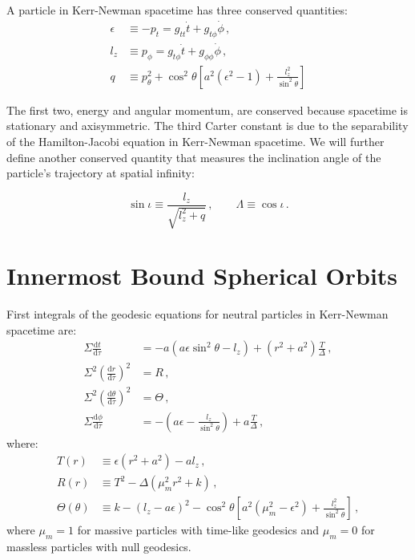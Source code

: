\documentclass[11pt, twocolumn]{article}
\begin{document}
A particle in Kerr-Newman spacetime has three conserved quantities:
\begin{equation}
    \begin{split}
        \epsilon &\equiv -p_{t} = g_{tt} \dot{t} + g_{t\phi} \dot{\phi} \, , \\
        l_{z} &\equiv p_{\phi} = g_{t\phi} \dot{t} + g_{\phi\phi} \dot{\phi} \, , \\
        q &\equiv p_{\theta}^{2} + \cos^{2}{\theta} \left[ a^{2} (\epsilon^{2} - 1) + \frac{l_{z}^{2}}{\sin^{2}{\theta}} \right]
    \end{split}
\end{equation}

The first two, energy and angular momentum, are conserved because spacetime is stationary and axisymmetric. The third Carter constant is due to the separability of the Hamilton-Jacobi equation in Kerr-Newman spacetime. We will further define another conserved quantity that measures the inclination angle of the particle's trajectory at spatial infinity:

\begin{equation}
    \sin{\iota} \equiv \frac{l_{z}}{\sqrt{l_{z}^{2} + q}} \, , \qquad \Lambda \equiv \cos{\iota} \, .
\end{equation}


\section{Innermost Bound Spherical Orbits} \label{app:ibso}


First integrals of the geodesic equations for neutral particles in Kerr-Newman spacetime are:
\begin{equation}
    \begin{split}
        \Sigma \frac{\mathrm{d}t}{\mathrm{d}\tau} &= -a(a \epsilon \sin^{2}{\theta} - l_{z}) + (r^{2} + a^{2}) \frac{T}{\Delta} \, , \\
        \Sigma^{2} \left( \frac{\mathrm{d}r}{\mathrm{d}\tau} \right)^{2} &= R \, , \\
        \Sigma^{2} \left( \frac{\mathrm{d}\theta}{\mathrm{d}\tau} \right)^{2} &= \Theta \, , \\
        \Sigma \frac{\mathrm{d}\phi}{\mathrm{d}\tau} &= -\left( a \epsilon - \frac{l_{z}}{\sin^{2}{\theta}} \right) + a \frac{T}{\Delta} \, ,
    \end{split}
\end{equation}
where:
\begin{equation}
    \begin{split}
        T(r) &\equiv \epsilon (r^{2} + a^{2}) - al_{z} \, , \\
        R(r) &\equiv T^{2} - \Delta (\mu_{m}^{2} r^{2} + k) \, , \\
        \Theta(\theta) &\equiv k - (l_{z} - a\epsilon)^{2} - \cos^{2}{\theta} \left[ a^{2} (\mu_{m}^{2} - \epsilon^{2}) + \frac{l_{z}^{2}}{\sin^{2}{\theta}} \right] \, ,
    \end{split}
\end{equation}
where $\mu_{m} = 1$ for massive particles with time-like geodesics and $\mu_{m} = 0$ for massless particles with null geodesics.
\end{document}
